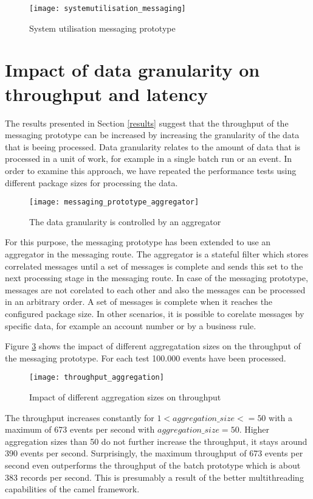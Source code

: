 \begin{figure}[htbp]
	\centering
	\texttt{[image: systemutilisation\_messaging]}
	\caption{System utilisation messaging prototype}
	\label{fig:systemutilisation_messaging}
\end{figure}

\section{Impact of data granularity on throughput and latency}\label{sec:impact_granularity}
The results presented in Section \ref{results} suggest that the throughput of the messaging prototype can be increased by increasing the granularity of the data that is beeing processed. Data granularity relates to the amount of data that is processed in a unit of work, for example in a single batch run or an event.
In order to examine this approach, we have repeated the performance tests using different package sizes for processing the data.

\begin{figure}[htbp]
	\centering
	\texttt{[image: messaging\_prototype\_aggregator]}
	\caption{The data granularity is controlled by an aggregator}
	\label{fig:messaging_prototype_aggregator}
\end{figure}

For this purpose, the messaging prototype has been extended to use an aggregator in the messaging route. The aggregator is a stateful filter which stores correlated messages until a set of messages is complete and sends this set to the next processing stage in the messaging route. In case of the messaging prototype, messages are not corelated to each other and also the messages can be processed in an arbitrary order. A set of messages is complete when it reaches the configured package size. In other scenarios, it is possible to corelate messages by specific data, for example an account number or by a business rule.

Figure \ref{fig:throughput_aggregation} shows the impact of different aggregatation sizes on the throughput of the messaging prototype. For each test 100.000 events have been processed.
\begin{figure}[htbp]
	\centering
	\texttt{[image: throughput\_aggregation]}
	\caption{Impact of different aggregation sizes on throughput}
	\label{fig:throughput_aggregation}
\end{figure}
The throughput increases constantly for $1<aggregation\_size<=50$ with a maximum of 673 events per second with $aggregation\_size=50$. Higher aggregation sizes than 50 do not further increase the throughput, it stays around 390 events per second. Surprisingly, the maximum throughput of 673 events per second even outperforms the throughput of the batch prototype which is about 383 records per second. This is presumably a result of the better multithreading capabilities of the camel framework.

